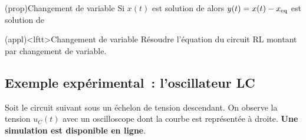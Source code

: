 \documentclass[../../main/main.tex]{subfiles}
\begin{document}
\begin{tcb}[label=prop:chvar, sidebyside](prop){Changement de variable}
	Si $x(t)$ est solution de
	\psw{%
	\[
		\boxed{ \dv[2]{x}{t} + \w_0{}^2x = \w_0{}^2x_{\rm eq}}
	\]
	}%
	\tcblower
	alors $y(t) = x(t) - x_{\rm eq}$ est solution de
	\psw{%
		\[
			\boxed{ \dv[2]{y}{t} + \w_0{}^2y = 0}
		\]
	}%
\end{tcb}
\begin{tcb}(appl)<lftt>{Changement de variable}
	Résoudre l'équation du circuit RL montant par changement de variable.
	\tcblower
	\begin{isd}
		\vspace{-15pt}
		\tcblower
		\vspace{-15pt}
	\end{isd}
	\vspace*{-30pt}
\end{tcb}

\subsection{Exemple expérimental~: l'oscillateur LC}

Soit le circuit suivant sous un échelon de tension descendant. On observe la
tension $u_C(t)$ avec un oscilloscope dont la courbe est représentée à droite.
\textbf{Une simulation est disponible en
	ligne}.
\end{document}
